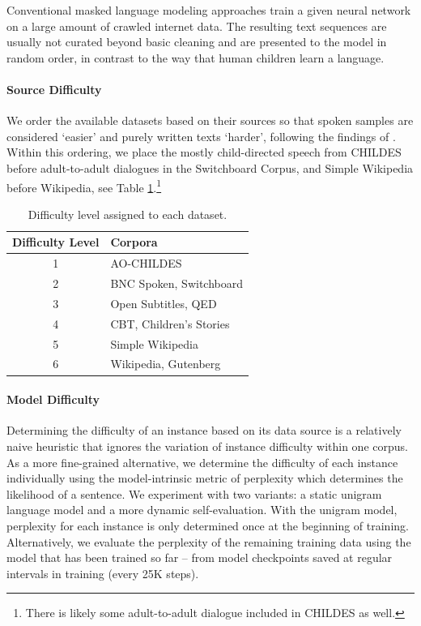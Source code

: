 Conventional masked language modeling approaches train a given neural network on a large amount of crawled internet data. The resulting text sequences are usually not curated beyond basic cleaning and are presented to the model in random order, in contrast to the way that human children learn a language.
 

\paragraph{Source Difficulty} We order the available datasets based on their sources so that spoken samples are considered `easier' and purely written texts `harder', following the findings of \citet{huebner2021babyberta}. Within this ordering, we place the mostly child-directed speech from CHILDES before adult-to-adult dialogues in the Switchboard Corpus, and Simple Wikipedia before Wikipedia, see Table \ref{tbl:source_order}.\footnote{There is likely some adult-to-adult dialogue included in CHILDES as well.}

\begin{table}
\centering
\small
\begin{tabular}{cl}
\toprule
Difficulty Level & Corpora \\
\midrule
1 & AO-CHILDES\\
2 & BNC Spoken, Switchboard \\
3 & Open Subtitles, QED \\
4 & CBT, Children's Stories \\
5 & Simple Wikipedia \\
6 & Wikipedia, Gutenberg \\
\bottomrule
\end{tabular}
\caption{\label{tbl:source_order} Difficulty level assigned to each dataset.}
\end{table}

\paragraph{Model Difficulty}
Determining the difficulty of an instance based on its data source is a relatively naive heuristic that ignores the variation of instance difficulty within one corpus. As a more fine-grained alternative, we determine the difficulty of each instance individually using the model-intrinsic metric of perplexity which determines the likelihood of a sentence. We experiment with two variants: a static unigram language model and a more dynamic self-evaluation. With the unigram model, perplexity for each instance is only determined once at the beginning of training. Alternatively, we evaluate the perplexity of the remaining training data using the model that has been trained so far -- from model checkpoints saved at regular intervals in training (every 25K steps). 


